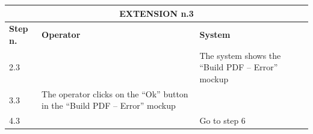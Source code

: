 {{{\begin{center}
			\begin{tabular}{|p{2cm}|p{6cm}|p{6cm}|}
			\hline
				\multicolumn{3}{|c|}{EXTENSION n.3}\\
			\hline
				\centering \vspace{1mm} \bfseries{Step n.} \vspace{1mm} & \vspace{1mm} \bfseries{Operator} \vspace{1mm} & \vspace{1mm} \bfseries{System} \vspace{1mm}\\
			\hline
				\vspace{1mm} 2.3\vspace{1mm} &
				\vspace{1mm} \vspace{1mm} & 
				\vspace{1mm} The system shows the “Build PDF – Error” mockup\vspace{1mm} \\
			\hline
				\vspace{1mm} 3.3\vspace{1mm} &
				\vspace{1mm} The operator clicks on the “Ok” button in the “Build PDF – Error” mockup\vspace{1mm} & 
				\vspace{1mm} \vspace{1mm} \\
			\hline
				\vspace{1mm} 4.3\vspace{1mm} &
				\vspace{1mm} \vspace{1mm} & 
				\vspace{1mm} Go to step 6\vspace{1mm} \\
			\hline
			\end{tabular}
			\end{center}
			
			\clearpage
	
}}}
